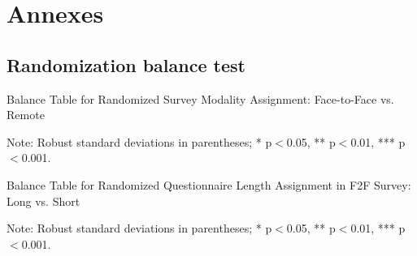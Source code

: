 \documentclass[11pt,harvard]{article}
\begin{document}
	\pagebreak
	
	
	\section{Annexes}
	
	\subsection{Randomization balance test}
	
	\begin{table}[htbp]
		\centering
		\begin{adjustbox}{max width=\textwidth}
			\begin{threeparttable}
				\caption{Balance Table for Randomized Survey Modality Assignment: Face-to-Face vs. Remote}
				\scriptsize
				 
				\label{tab:BF_Listing_Demo_Balance_Modality}
				\begin{tablenotes}
					\item Note: Robust standard deviations in parentheses; * p$<$0.05, ** p$<$0.01, *** p$<$0.001. 
				\end{tablenotes}
			\end{threeparttable}
		\end{adjustbox}
	\end{table}
	
	
	
	\begin{table}[htbp]
		\centering
		\begin{adjustbox}{max width=\textwidth}
			\begin{threeparttable}
				\caption{Balance Table for Randomized Questionnaire Length Assignment in F2F Survey: Long vs. Short}
				\scriptsize
				 
				\label{tab:BF_Listing_Demo_Balance_F2F_Length}
				\begin{tablenotes}
					\item Note: Robust standard deviations in parentheses; * p$<$0.05, ** p$<$0.01, *** p$<$0.001.
				\end{tablenotes}
			\end{threeparttable}
		\end{adjustbox}
	\end{table}
	
\end{document}

